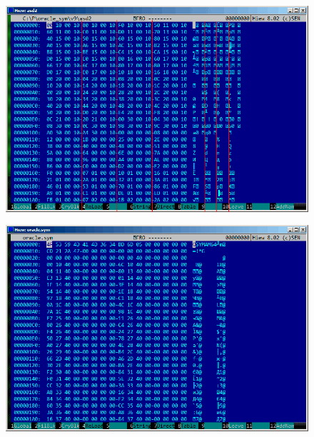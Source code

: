 \begin{figure}[H]
\centering
\includegraphics[scale=\FigScale]{examples/oracle/SYM/binary2.png}
\caption{}
\label{fig:oracle_SYM_binary2}
\end{figure}

\begin{figure}[H]
\centering
\includegraphics[scale=\FigScale]{examples/oracle/SYM/whole64.png}
\caption{}
\label{fig:oracle_SYM_whole64}
\end{figure}
